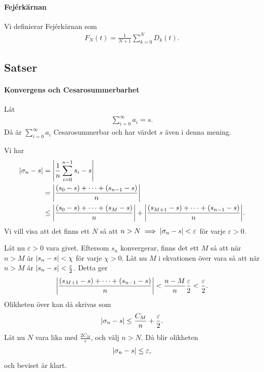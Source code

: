 \paragraph{Fejérkärnan}
Vi definierar Fejérkärnan som
\begin{align*}
	F_{N}(t) = \frac{1}{N + 1}\sum\limits_{k = 0}^{N}D_{k}(t).
\end{align*}

\subsection{Satser}

\paragraph{Konvergens och Cesarosummerbarhet}
Låt
\begin{align*}
	\sum\limits_{i = 0}^{\infty}a_{i} = s.
\end{align*}
Då är $\sum\limits_{i = 0}^{\infty}a_{i}$ Cesarosummerbar och har värdet $s$ även i denna mening.

\proof
Vi har
\begin{align*}
	\abs{\sigma_{n} - s} &= \abs{\frac{1}{n}\sum\limits_{i = 0}^{n - 1}s_{i} - s} \\
	                     &= \abs{\frac{(s_{0} - s) + \dots + (s_{n - 1} - s)}{n}} \\
	                     &\leq  \abs{\frac{(s_{0} - s) + \dots + (s_{M} - s)}{n}} + \abs{\frac{(s_{M + 1} - s) + \dots + (s_{n - 1} - s)}{n}}.
\end{align*}
Vi vill visa att det finns ett $N$ så att $n > N\implies \abs{\sigma_{n} - s} < \varepsilon$ för varje $\varepsilon > 0$.

Låt nu $\varepsilon > 0$ vara givet. Eftersom $s_{n}$ konvergerar, finns det ett $M$ så att när $n > M$ är $\abs{s_{n} - s} < \chi$ för varje $\chi > 0$. Låt nu $M$ i ekvationen över vara så att när $n > M$ är $\abs{s_{n} - s} < \frac{\varepsilon}{2}$. Detta ger
\begin{align*}
	\abs{\frac{(s_{M + 1} - s) + \dots + (s_{n - 1} - s)}{n}} < \frac{n - M}{n}\frac{\varepsilon}{2} < \frac{\varepsilon}{2}.
\end{align*}
Olikheten över kan då skrivas som
\begin{align*}
	\abs{\sigma_{n} - s} \leq \frac{C_{M}}{n} + \frac{\varepsilon}{2}.
\end{align*}
Låt nu $N$ vara lika med $\frac{2C_{M}}{\varepsilon}$, och välj $n > N$. Då blir olikheten
\begin{align*}
	\abs{\sigma_{n} - s} \leq \varepsilon,
\end{align*}
och beviset är klart.

